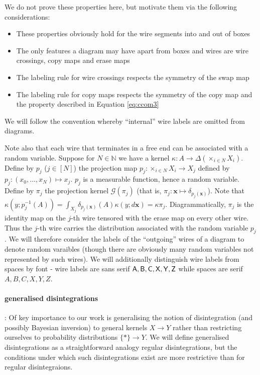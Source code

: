 We do not prove these properties here, but motivate them via the following considerations:
\begin{itemize}
 	\item These properties obviously hold for the wire segments into and out of boxes
 	\item The only features a diagram may have apart from boxes and wires are wire crossings, copy maps and erase maps
 	\item The labeling rule for wire crossings respects the symmetry of the swap map
 	\item The labeling rule for copy maps respects the symmetry of the copy map and the property described in Equation \ref{eq:ccom3}
\end{itemize}

We will follow the convention whereby ``internal'' wire labels are omitted from diagrams.

Note also that each wire that terminates in a free end can be associated with a random variable. Suppose for $N\in\mathbb{N}$ we have a kernel $\kappa:A\to \Delta(\times_{i\in N} X_i)$. Define by $p_j$ ($j\in[N]$) the projection map $p_j:\times_{i\in N}X_i\to X_j$ defined by $p_j:(x_0,...,x_N)\mapsto x_j$. $p_j$ is a measurable function, hence a random variable. Define by $\pi_j$ the projection kernel $\mathcal{G}(\pi_j)$ (that is, $\pi_j:\mathbf{x}\mapsto \delta_{p_j(\mathbf{x})}$). Note that $\kappa(y;p_j^{-1}(A))=\int_{X_j} \delta_{p_j(\mathbf{x})}(A) \kappa(y;d\mathbf{x}) = \kappa \pi_j$. Diagrammatically, $\pi_j$ is the identity map on the $j$-th wire tensored with the erase map on every other wire. Thus the $j$-th wire carries the distribution associated with the random variable $p_j$. We will therefore consider the labels of the ``outgoing'' wires of a diagram to denote random varaibles (though there are obviously many random variables not represented by such wires). We will additionally distinguish wire labels from spaces by font - wire labels are sans serif $\mathsf{A,B,C,X,Y,Z}$ while spaces are serif $A,B,C,X,Y,Z$.


\paragraph{generalised disintegrations}: Of key importance to our work is generalising the notion of disintegration (and possibly Bayesian inversion) to general kernels $X\to Y$ rather than restricting ourselves to probability distributions $\{*\}\to Y$. We will define generalised disintegrations as a straightforward analogy regular disintegrations, but the conditions under which such disintegrations exist are more restrictive than for regular disintegraions.

